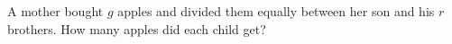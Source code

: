 A mother bought $g$ apples and divided them equally between her son and his $r$ brothers. How many apples did each child get?
